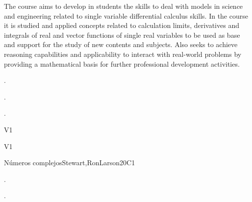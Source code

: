 \begin{syllabus}


\begin{justification}
The course aims to develop in students the skills to deal with models in science and engineering related to
single variable differential calculus skills. In the course it is studied and applied concepts related to calculation
limits, derivatives and integrals of real and vector functions of single real variables to be used as base and
support for the study of new contents and subjects. Also seeks to achieve reasoning capabilities and
applicability to interact with real-world problems by providing a mathematical basis for further professional
development activities.
\end{justification}

\begin{goals}
\item . %
\item . %
\item . %

\end{goals}

\begin{outcomes}{V1}
    \item {}
    \item {}
\end{outcomes}

\begin{competences}{V1}
    \item {}
    \item {}
    \item {}
\end{competences}

\begin{unit}{Números complejos}{}{Stewart,RonLarson}{20}{C1}
   \begin{topics}
    \item . %
    \item . %
   \end{topics}


\end{unit}
\end{syllabus}
